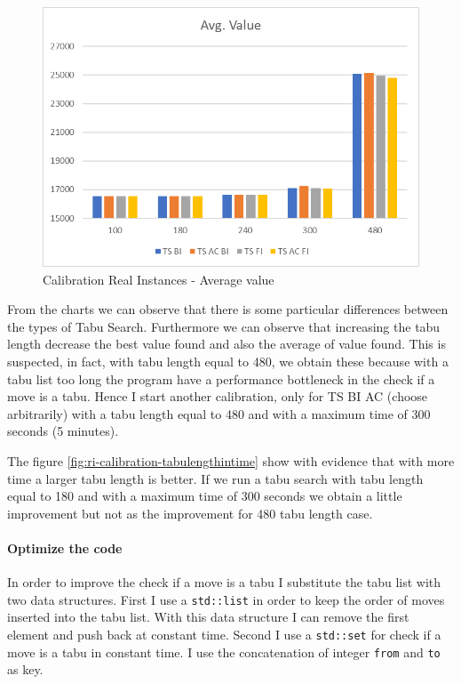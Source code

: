 \newpage	
	
		\begin{figure}[ht]
			\centering
			\includegraphics[width=\linewidth]{img/RI-calibration-SC-avg}
			\caption{Calibration Real Instances - Average value}
			\label{fig:ri-calibration-sc-avg}
		\end{figure}
		
			From the charts we can observe that there is some particular differences between the types of Tabu Search. 
			Furthermore we can observe that increasing the tabu length decrease the best value found and also the average of value found. This is suspected, in fact, with tabu length equal to 480, we obtain these because with a tabu list too long the program have a performance bottleneck in the check if a move is a tabu. Hence I start another calibration, only for TS BI AC (choose arbitrarily) with a tabu length equal to 480 and with a maximum time of 300 seconds (5 minutes).
			
			The figure \ref{fig:ri-calibration-tabulengthintime} show with evidence that with more time a larger tabu length is better. If we run a tabu search with tabu length equal to 180 and with a maximum time of 300 seconds we obtain a little improvement but not as the improvement for 480 tabu length case.
			
			\paragraph*{Optimize the code} In order to improve the check if a move is a tabu I substitute the tabu list with two data structures. First I use a \verb|std::list| in order to keep the order of moves inserted into the tabu list. With this data structure I can remove the first element and push back at constant time.
			Second I use a \verb|std::set| for check if a move is a tabu in constant time. I use the concatenation of integer \verb|from| and \verb|to| as key.
			
